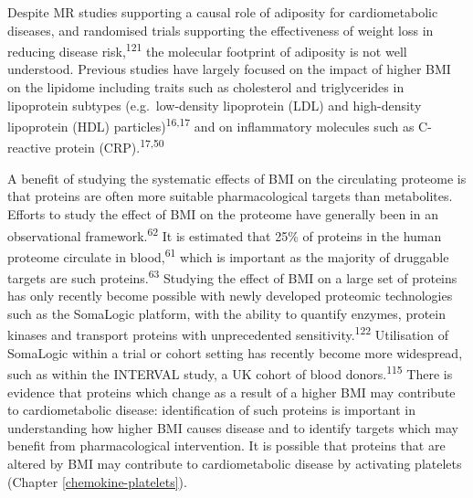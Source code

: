 \documentclass[11pt,twoside]{bristolthesis}
\begin{document}
Despite MR studies supporting a causal role of adiposity for cardiometabolic diseases, and randomised trials supporting the effectiveness of weight loss in reducing disease risk,\textsuperscript{121} the molecular footprint of adiposity is not well understood. Previous studies have largely focused on the impact of higher BMI on the lipidome including traits such as cholesterol and triglycerides in lipoprotein subtypes (e.g.~low-density lipoprotein (LDL) and high-density lipoprotein (HDL) particles)\textsuperscript{16,17} and on inflammatory molecules such as C-reactive protein (CRP).\textsuperscript{17,50}

A benefit of studying the systematic effects of BMI on the circulating proteome is that proteins are often more suitable pharmacological targets than metabolites. Efforts to study the effect of BMI on the proteome have generally been in an observational framework.\textsuperscript{62} It is estimated that 25\% of proteins in the human proteome circulate in blood,\textsuperscript{61} which is important as the majority of druggable targets are such proteins.\textsuperscript{63} Studying the effect of BMI on a large set of proteins has only recently become possible with newly developed proteomic technologies such as the SomaLogic platform, with the ability to quantify enzymes, protein kinases and transport proteins with unprecedented sensitivity.\textsuperscript{122} Utilisation of SomaLogic within a trial or cohort setting has recently become more widespread, such as within the INTERVAL study, a UK cohort of blood donors.\textsuperscript{115} There is evidence that proteins which change as a result of a higher BMI may contribute to cardiometabolic disease: identification of such proteins is important in understanding how higher BMI causes disease and to identify targets which may benefit from pharmacological intervention. It is possible that proteins that are altered by BMI may contribute to cardiometabolic disease by activating platelets (Chapter \ref{chemokine-platelets}).
\end{document}
